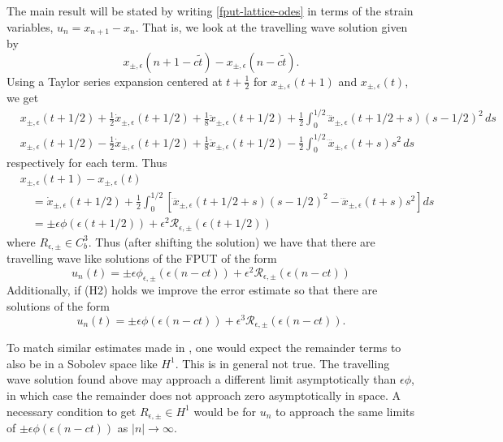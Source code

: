 The main result will be stated by writing \cref{fput-lattice-odes} in terms of the strain variables, \(u_n = x_{n+1} - x_n\). That is, we look at the travelling wave solution given by 
\begin{equation}
	x_{\pm, \epsilon}(n+1-c\tilde t) - x_{\pm, \epsilon}(n-c\tilde t).
\end{equation}
Using a Taylor series expansion centered at \(t + \frac 12 \) for \( x_{\pm, \epsilon}(t+ 1)\) and \( x_{\pm, \epsilon}(t)\), we get 
\begin{align}
	& x_{\pm, \epsilon}(t+ 1/2) + \frac 12 \dot x_{\pm, \epsilon}(t+1/2) + \frac 1 8\ddot x_{\pm, \epsilon}(t+1/2) + \frac 1 2\int_{0}^{1/2} \dddot x_{\pm, \epsilon}(t+1/2+s)(s-1/2)^2 \, ds \\
	& x_{\pm, \epsilon}(t+ 1/2) - \frac 12 \dot x_{\pm, \epsilon}(t+1/2) + \frac 1 8 \ddot x_{\pm, \epsilon}(t+1/2) - \frac 1 2\int_0^{1/2} \dddot x_{\pm, \epsilon}(t+s)s^2 \, ds 
\end{align}
respectively for each term. Thus 
\begin{equation}
\begin{aligned}
	&x_{\pm, \epsilon}(t+1) - x_{\pm, \epsilon}(t) \\
	&\quad= \dot x_{\pm, \epsilon}(t+ 1/2) + \frac 12 \int_{0}^{1/2} [\dddot x_{\pm, \epsilon}(t+1/2+s)(s-1/2)^2 - \dddot x_{\pm, \epsilon}(t+s)s^2] ds \\
	&\quad= \pm \epsilon \phi(\epsilon (t+1/2)) + \epsilon^2 \mathcal R_{\epsilon, \pm}(\epsilon (t+1/2))
\end{aligned}
\end{equation}
where \(R_{\epsilon, \pm} \in C^3_b\). Thus (after shifting the solution) we have that there are travelling wave like solutions of the FPUT of the form
\begin{equation}
	u_n(t) = \pm \epsilon \phi_{\epsilon, \pm}(\epsilon(n-ct)) + \epsilon^2 \mathcal R_{\epsilon, \pm}(\epsilon (n-ct))
\end{equation}
Additionally, if (H2) holds we improve the error estimate so that there are solutions of the form 
\begin{equation}
	u_n(t) = \pm \epsilon \phi(\epsilon(n-ct)) + \epsilon^3 \mathcal R_{\epsilon, \pm}(\epsilon (n-ct)).
\end{equation}

To match similar estimates made in \cite{friesecke1999solitary}, one would expect the remainder terms to also be in a Sobolev space like \(H^1\). This is in general not true. The travelling wave solution found above may approach a different limit asymptotically than \(\epsilon \phi \), in which case the remainder does not approach zero asymptotically in space. A necessary condition to get \(R_{\epsilon,\pm}\in H^1\) would be for \(u_n\) to approach the same limits of \(\pm \epsilon \phi(\epsilon (n-ct))\) as \(|n| \to \infty\).

